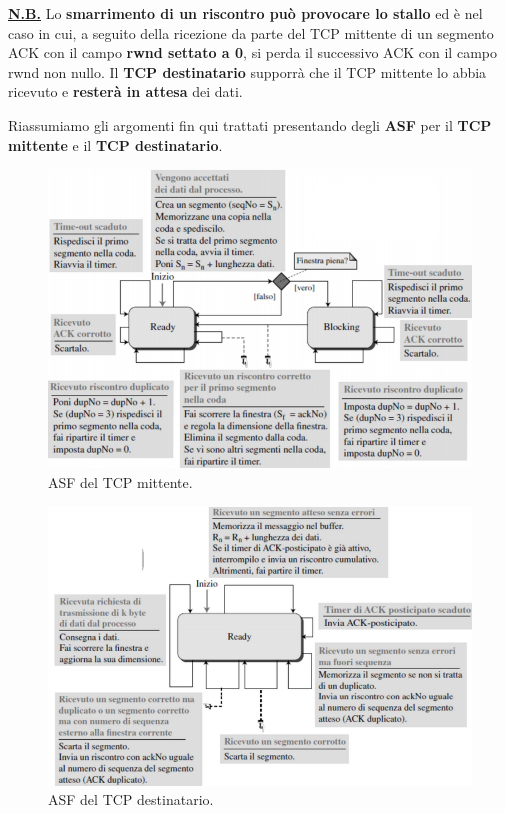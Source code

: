 \documentclass[11pt,a4paper,oneside]{book}
\theoremstyle{definition}
\begin{document}
\textbf{\underline{N.B.}} Lo \textbf{smarrimento di un riscontro può provocare lo stallo} ed è nel caso in cui, a seguito della ricezione da parte del TCP mittente di un segmento ACK con  il campo \textbf{rwnd settato a 0}, si perda il successivo ACK con il campo rwnd non nullo. Il \textbf{TCP destinatario} supporrà che il TCP mittente lo abbia ricevuto e \textbf{resterà in attesa} dei dati.

\pagebreak

Riassumiamo gli argomenti fin qui trattati presentando degli \textbf{ASF} per il \textbf{TCP mittente} e il \textbf{TCP destinatario}.
\begin{figure}[!h]
	\includegraphics[scale=0.47]{Immagini/ASF_tcpm.png}
	\centering
	\caption{ASF del TCP mittente.}
\end{figure}
\begin{figure}[!h]
	\includegraphics[scale=0.47]{Immagini/ASF_tcpd.png}
	\centering
	\caption{ASF del TCP destinatario.}
\end{figure}
\end{document}
